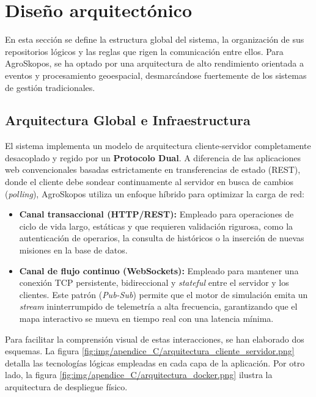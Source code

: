 
\section{Diseño arquitectónico}
En esta sección se define la estructura global del sistema, la organización de sus repositorios lógicos y las reglas que rigen la comunicación entre ellos. Para AgroSkopos, se ha optado por una arquitectura de alto rendimiento orientada a eventos y procesamiento geoespacial, desmarcándose fuertemente de los sistemas de gestión tradicionales.

\subsection{Arquitectura Global e Infraestructura}
El sistema implementa un modelo de arquitectura cliente-servidor completamente desacoplado y regido por un \textbf{Protocolo Dual}. A diferencia de las aplicaciones web convencionales basadas estrictamente en transferencias de estado (REST), donde el cliente debe sondear continuamente al servidor en busca de cambios (\textit{polling}), AgroSkopos utiliza un enfoque híbrido para optimizar la carga de red:
\begin{itemize}
    \item \textbf{Canal transaccional (HTTP/REST):} Empleado para operaciones de ciclo de vida largo, estáticas y que requieren validación rigurosa, como la autenticación de operarios, la consulta de históricos o la inserción de nuevas misiones en la base de datos.
    \item \textbf{Canal de flujo continuo (WebSockets):} Empleado para mantener una conexión TCP persistente, bidireccional y \textit{stateful} entre el servidor y los clientes. Este patrón (\textit{Pub-Sub}) permite que el motor de simulación emita un \textit{stream} ininterrumpido de telemetría a alta frecuencia, garantizando que el mapa interactivo se mueva en tiempo real con una latencia mínima.
\end{itemize}

Para facilitar la comprensión visual de estas interacciones, se han elaborado dos esquemas. La figura \ref{fig:img/apendice_C/arquitectura_cliente_servidor.png} detalla las tecnologías lógicas empleadas en cada capa de la aplicación. Por otro lado, la figura \ref{fig:img/apendice_C/arquitectura_docker.png} ilustra la arquitectura de despliegue físico.

